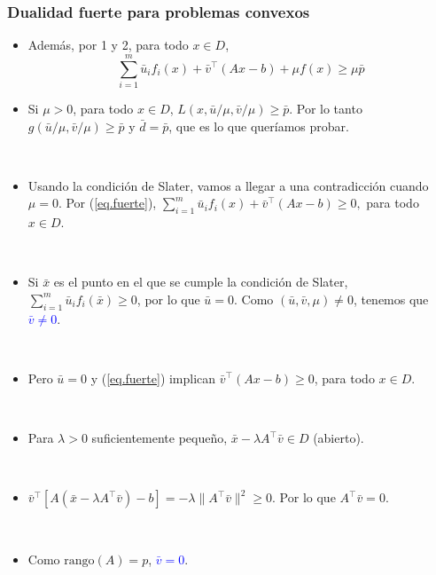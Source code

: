 \documentclass{beamer}
\begin{document}
\begin{frame}
\frametitle{Dualidad fuerte para problemas convexos}




{\scriptsize

\begin{itemize}
\item Además,  por 1 y 2, para todo $x\in D$,
\begin{equation}
\label{eq.fuerte}
\sum_{i=1}^m \bar{u}_i f_i(x) + \bar{v}^\top (Ax-b) + \mu f(x) \geq \mu\bar{p}
\end{equation}


\item Si $\mu>0$, para todo $x\in D$, $L(x,\bar{u}/\mu,\bar{v}/\mu)\geq\bar{p}$. Por lo tanto 
$g(\bar{u}/\mu,\bar{v}/\mu)\geq \bar{p}$ y $\bar{d}=\bar{p}$, que es lo que queríamos probar.

\

\item Usando la condición de Slater, vamos a llegar a una contradicción cuando $\mu=0$. Por (\ref{eq.fuerte}),
$
\sum_{i=1}^m \bar{u}_i f_i(x) + \bar{v}^\top (Ax-b) \geq 0,
$
para todo $x\in D$.


\


\item Si $\bar{x}$ es el punto en el que se cumple la condición de Slater, $\sum_{i=1}^m \bar{u}_i f_i(\bar{x})\geq 0$, por lo que $\bar{u}=0$. Como $(\bar{u},\bar{v},\mu)\neq 0$, tenemos que \textcolor{blue}{$\bar{v}\neq 0$}.

\

\item Pero $\bar{u}=0$ y (\ref{eq.fuerte}) implican $\bar{v}^\top (Ax-b) \geq 0$, para todo $x\in D$.

\

\item Para $\lambda>0$ suficientemente pequeño, $\bar{x}-\lambda A^{\top}\bar{v}\in D$ (abierto).

\

\item $\bar{v}^\top[A(\bar{x}-\lambda A^{\top}\bar{v}) - b] = -\lambda \|A^\top\bar{v}\|^2\geq 0$. Por lo que $A^\top\bar{v}=0$.

\

\item Como $\mbox{rango}(A)=p$, \textcolor{blue}{$\bar{v}=0$}. 


\end{itemize}

}


\end{frame}





\end{document}
